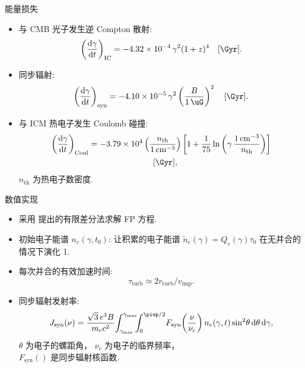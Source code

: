 \documentclass{beamer}
\newcommand{\R}[1]{\text{#1}}  %
\newcommand{\Cpi}{\piup}  %
\newcommand{\D}[1]{\R{d}#1}
\newcommand{\diff}[2]{\frac{\D{#1}}{\D{#2}}}
\newcommand{\citeay}[1]{\citeauthor{#1} \citeyear{#1} \parencite{#1}}
\begin{document}
\begin{frame}
  \begin{alertblock}{能量损失}
    \smallskip
    \begin{itemize}
      \item 与 CMB 光子发生逆 Compton 散射:
        \begin{equation}
          \left( \diff{\gamma}{t} \right)_{\R{IC}} =
            \num{-4.32e-4} \,\gamma^2 (1+z)^4
            \quad [\si{\per\Gyr}] .
        \end{equation}
      \item 同步辐射:
        \begin{equation}
          \left( \diff{\gamma}{t} \right)_{\R{syn}} =
            \num{-4.10e-5} \,\gamma^2
            \left( \frac{B}{\SI{1}{\uG}} \right)^2
            \quad [\si{\per\Gyr}] .
        \end{equation}
      \item 与 ICM 热电子发生 Coulomb 碰撞:
        \begin{multline}
          \left( \diff{\gamma}{t} \right)_{\R{Coul}} =
            \num{-3.79e4} \left( \frac{n_{\R{th}}}{\SI{1}{\per\cm\cubed}} \right)
            \left[ 1 + \frac{1}{75} \ln \left(
              \gamma\,\frac{\SI{1}{\per\cm\cubed}}{n_{\R{th}}} \right) \right]
            \\ \quad [\si{\per\Gyr}] ,
        \end{multline}
        $n_{\R{th}}$ 为热电子数密度.
    \end{itemize}
  \end{alertblock}
\end{frame}

\begin{frame}{数值实现}
  \begin{itemize}
    \item 采用 \citeay{chang1970} 提出的有限差分法求解 FP 方程.
    \item 初始电子能谱 $n_e(\gamma, t_0)$:
      让积累的电子能谱 $\tilde{n}_e(\gamma) = Q_e(\gamma) \tau_0$
      在无并合的情况下演化 \SI{1}{\Gyr}.
    \item 每次并合的有效加速时间:
      \begin{equation}
        \tau_{\R{turb}} \simeq 2 r_{\R{turb}} / v_{\R{imp}} .
      \end{equation}
    \item 同步辐射发射率:
      \begin{equation}
        J_{\R{syn}}(\nu) =
          \frac{\sqrt{3} \,e^3 B}{m_e c^2}
          \!\int_{\gamma_{\R{min}}}^{\gamma_{\R{max}}}
          \!\!\!\int_0^{\Cpi/2}
          \! F_{\R{syn}} \!\left( \frac{\nu}{\nu_c} \right)
          n_e(\gamma, t) \sin^2 \!\theta \,\D{\theta} \,\D{\gamma} ,
      \end{equation}
      $\theta$ 为电子的螺距角，
      $\nu_c$ 为电子的临界频率，\\
      $F_{\R{syn}}()$ 是同步辐射核函数.
  \end{itemize}
\end{frame}
\end{document}
